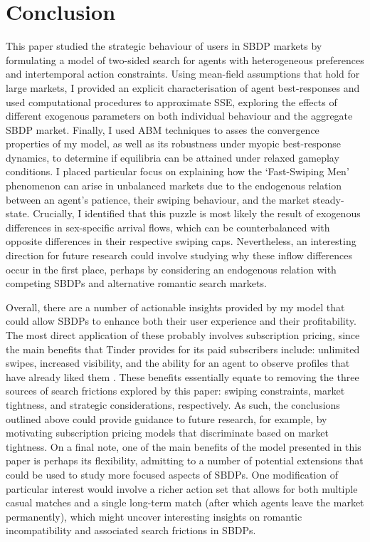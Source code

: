 \section{Conclusion}
\label{sec:section5}
This paper studied the strategic behaviour of users in SBDP markets by formulating a model of two-sided search for agents with heterogeneous preferences and intertemporal action constraints. 
Using mean-field assumptions that hold for large markets, I provided an explicit characterisation of agent best-responses and used computational procedures to approximate SSE, exploring the effects of different exogenous parameters on both individual behaviour and the aggregate SBDP market.
Finally, I used ABM techniques to asses the convergence properties of my model, as well as its robustness under myopic best-response dynamics, to determine if equilibria can be attained under relaxed gameplay conditions.
I placed particular focus on explaining how the `Fast-Swiping Men' phenomenon can arise in unbalanced markets due to the endogenous relation between an agent's patience, their swiping behaviour, and the market steady-state. 
Crucially, I identified that this puzzle is most likely the result of exogenous differences in sex-specific arrival flows, which can be counterbalanced with opposite differences in their respective swiping caps. 
Nevertheless, an interesting direction for future research could involve studying why these inflow differences occur in the first place, perhaps by considering an endogenous relation with competing SBDPs and alternative romantic search markets. 

Overall, there are a number of actionable insights provided by my model that could allow SBDPs to enhance both their user experience and their profitability.
The most direct application of these probably involves subscription pricing, since the main benefits that Tinder provides for its paid subscribers include: unlimited swipes, increased visibility, and the ability for an agent to observe profiles that have already liked them \citep{web:tinder_subscription}.
These benefits essentially equate to removing the three sources of search frictions explored by this paper: swiping constraints, market tightness, and strategic considerations, respectively.
As such, the conclusions outlined above could provide guidance to future research, for example, by motivating subscription pricing models that discriminate based on market tightness.
On a final note, one of the main benefits of the model presented in this paper is perhaps its flexibility, admitting to a number of potential extensions that could be used to study more focused aspects of SBDPs. 
One modification of particular interest would involve a richer action set that allows for both multiple casual matches and a single long-term match (after which agents leave the market permanently), which might uncover interesting insights on romantic incompatibility and associated search frictions in SBDPs.